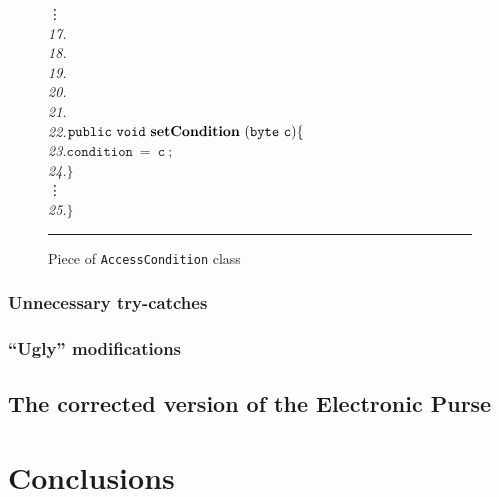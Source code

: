 \documentclass[a4paper]{llncs}
\begin{document}
\begin{center}
\begin{figure}[hbt]
\begin{tabbing}
\>\>\vdots \\

\emph{17.}\> \\
\emph{18.}\>\> \\
\emph{19.}\>\> \\
\emph{20.}\>\> \\
\emph{21.}\>\>{\it */} \\
\emph{22.}\>\>$\mathtt{public\ void\ {\bf setCondition}\ (byte\ c)\{}$\\
\emph{23.}\>\>\>$\mathtt{condition\ =\ c\ ;}$\\
\emph{24.}\>\>$\mathtt{\}}$\\

\>\>\vdots \\
\emph{25.}\>$\mathtt{\}}$
\end{tabbing}
\caption{Piece of {\tt AccessCondition} class}
\label{fig-cla-acc}
\rule{\linewidth}{0.3mm}
\end{figure}
\end{center}




\subsubsection{Unnecessary try-catches}




\subsubsection{``Ugly'' modifications}




\subsection{The corrected version of the Electronic Purse}






\section{Conclusions}
\label{SectConcl}
\end{document}
